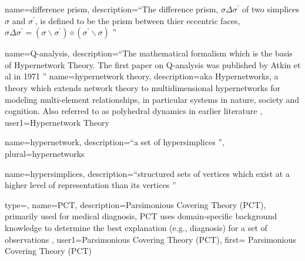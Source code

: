 {
  name=difference prism,
  description={``The difference prism, $\sigma \Delta \sigma ^{\prime }$ of two simplices $%
\sigma $ and $\sigma ^{\prime }$, is defined to be the prism between thier
eccentric faces, $\sigma \Delta \sigma ^{\prime }=(\sigma \smallsetminus
\sigma ^{\prime })\diamond (\sigma ^{\prime }\smallsetminus \sigma )$ \citep{johnson2013hypernetworks}''}
}

{
  name=Q-analysis,
  description={``The mathematical formalism which is the basis of Hypernetwork Theory. The first paper on Q-analysis was published by Atkin et al in 1971 \citep{johnson2013hypernetworks}''}
}
{
  name=hypernetwork theory,
  description={aka Hypernetworks, a theory which extends network theory to multidimensional hypernetworks for modeling multi-element relationships, in particular systems in nature, society and cognition. Also referred to as \Gls{polyhedral dynamics} in earlier literature \citep{casti1977polyhedral, johnson2013hypernetworks, wang2010evolving}},
  user1={Hypernetwork Theory}
}


{
  name=hypernetwork,
  description={``a set of \gls{hypersimplices} \citep{johnson2013hypernetworks}''},
  plural=hypernetworks
}

{
  name=hypersimplices,
  description={``structured sets of vertices which exist at a higher level of representation than its vertices \citep{johnson2013hypernetworks}''}
}

{
  type=\acronymtype,
  name=PCT,
  description={Parsimonious Covering Theory (PCT), primarily used for medical diagnosis,
  PCT uses domain-specific background knowledge to determine
  the best explanation (e.g., diagnosis) for a set of observations \citep{henson2012semantic}},
  user1={Parsimonious Covering Theory (PCT)},
  first= {Parsimonious Covering Theory (PCT)}
}

